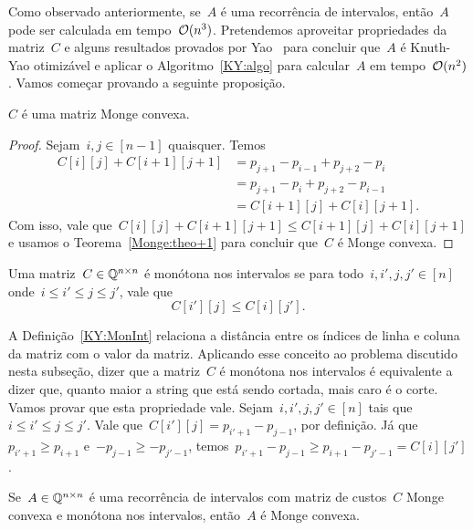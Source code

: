 Como observado anteriormente, se~$A$ é uma recorrência de intervalos, então~$A$ pode ser calculada em tempo~$\mathcal{O}(n^3)$. Pretendemos aproveitar propriedades da matriz~$C$ e alguns resultados provados por Yao~\cite{Yao:1980} para concluir que~$A$ é Knuth-Yao otimizável e aplicar o Algoritmo~\ref{KY:algo} para calcular~$A$ em tempo~$\mathcal{O}(n^2)$. Vamos começar provando a seguinte proposição.

\begin{prop}
$C$ é uma matriz Monge convexa.
\end{prop}

\begin{proof}
Sejam~$i,j \in [n-1]$ quaisquer. Temos 
\begin{align*}
    C[i][j] + C[i+1][j+1] &= p_{j+1} - p_{i-1} + p_{j+2} - p_{i} \\
                          &= p_{j+1} - p_{i} + p_{j+2} - p_{i-1} \\
                          &= C[i+1][j] + C[i][j+1] \text{.}
\end{align*}
Com isso, vale que~$C[i][j] + C[i+1][j+1] \leq C[i+1][j] + C[i][j+1]$ e usamos o Teorema~\ref{Monge:theo+1} para concluir que~$C$ é Monge convexa.
\end{proof}

\begin{defi} \label{KY:MonInt}
Uma matriz~$C \in \mathbb{Q}^{n \times n}$ é monótona nos intervalos se para todo~$i,i',j,j' \in [n]$ onde~$i \leq i' \leq j \leq j'$, vale que
$$C[i'][j] \leq C[i][j'] \text{.}$$
\end{defi}

A Definição~\ref{KY:MonInt} relaciona a distância entre os índices de linha e coluna da matriz com o valor da matriz. Aplicando esse conceito ao problema discutido nesta subseção, dizer que a matriz~$C$ é monótona nos intervalos é equivalente a dizer que, quanto maior a string que está sendo cortada, mais caro é o corte. Vamos provar que esta propriedade vale. Sejam~${i,i',j,j' \in [n]}$ tais que~${ i \leq i' \leq j \leq j' }$. Vale que~${ C[i'][j] = p_{i'+1} - p_{j-1} }$, por definição. Já que~${ p_{i'+1} \geq p_{i+1} }$ e~${ -p_{j-1} \geq -p_{j'-1} }$, temos~${ p_{i' + 1} - p_{j-1} \geq p_{i+1} - p_{ j'-1} = C[i][j'] }$.

\begin{lema} \label{KY:CtoA}
Se~$A \in \mathbb{Q}^{n \times n}$ é uma recorrência de intervalos com matriz de custos~$C$ Monge convexa e monótona nos intervalos, então~$A$ é Monge convexa.
\end{lema}


